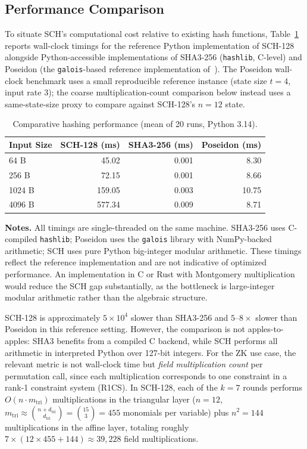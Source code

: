 ﻿\documentclass[english]{aucmcs}
\begin{document}
\subsection{Performance Comparison}
\label{sec:benchmark}

To situate SCH's computational cost relative to existing hash functions,
Table~\ref{tab:comparison} reports wall-clock timings for the reference Python
implementation of SCH-128 alongside Python-accessible implementations of
SHA3-256 (\texttt{hashlib}, C-level) and Poseidon (the \texttt{galois}-based
reference implementation of~\cite{Poseidon}). The Poseidon wall-clock
benchmark uses a small reproducible reference instance (state size $t=4$,
input rate $3$); the coarse multiplication-count comparison below instead uses
a same-state-size proxy to compare against SCH-128's $n=12$ state.

\begin{table}[H]
\centering
\caption{Comparative hashing performance (mean of 20 runs, Python 3.14).}
\label{tab:comparison}
\begin{tabular}{@{}lrrr@{}}
\toprule
Input Size & SCH-128 (ms) & SHA3-256 (ms) & Poseidon (ms) \\
\midrule
64 B  &  45.02 & 0.001 & 8.30 \\
256 B &  72.15 & 0.001 & 8.66 \\
1024 B & 159.05 & 0.003 & 10.75 \\
4096 B & 577.34 & 0.009 & 8.71 \\
\bottomrule
\end{tabular}
\vspace{0.5em}
\begin{minipage}{0.95\linewidth}
\small
\textbf{Notes.} All timings are single-threaded on the same machine.
SHA3-256 uses C-compiled \texttt{hashlib}; Poseidon uses the
\texttt{galois} library with NumPy-backed arithmetic; SCH uses pure
Python big-integer modular arithmetic. These timings reflect the
reference implementation and are not indicative of optimized
performance. An implementation in C or Rust with Montgomery
multiplication would reduce the SCH gap substantially, as the bottleneck
is large-integer modular arithmetic rather than the algebraic structure.
\end{minipage}
\end{table}

SCH-128 is approximately $5 \times 10^4$ slower than SHA3-256 and $5$--$8 \times$
slower than Poseidon in this reference setting. However, the comparison is
not apples-to-apples: SHA3 benefits from a compiled C backend, while SCH
performs all arithmetic in interpreted Python over 127-bit integers.
For the ZK use case, the relevant metric is not wall-clock time but
\emph{field multiplication count} per permutation call, since each
multiplication corresponds to one constraint in a rank-1 constraint system
(R1CS). In SCH-128, each of the $k=7$ rounds performs $O(n \cdot
m_{\mathrm{tri}})$ multiplications in the triangular layer ($n=12$,
$m_{\mathrm{tri}} \approx \binom{n + d_{\mathrm{tri}}}{d_{\mathrm{tri}}}
= \binom{15}{3} = 455$ monomials per variable) plus $n^2 = 144$
multiplications in the affine layer, totaling roughly
$7 \times (12 \times 455 + 144) \approx 39{,}228$ field multiplications.
\end{document}
